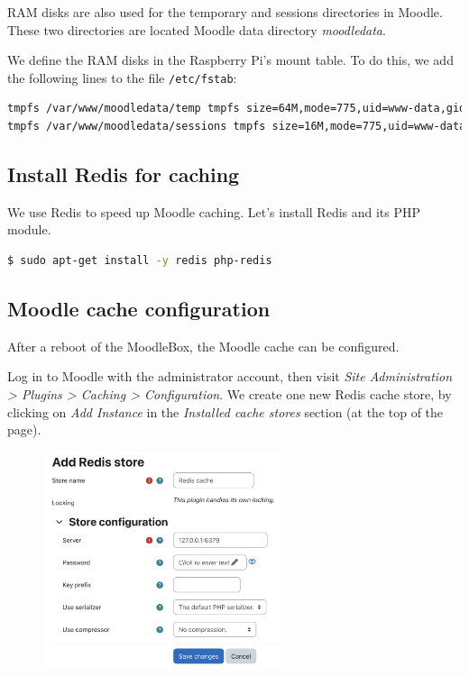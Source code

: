 \documentclass[12pt]{article}
\begin{document}
RAM disks are also used for the temporary and sessions directories in Moodle.
These two directories are located Moodle data directory \emph{moodledata}.

We define the RAM disks in the Raspberry Pi's mount table.
To do this, we add the following lines to the file \lstinline{/etc/fstab}:
\begin{lstlisting}[language=bash]
tmpfs /var/www/moodledata/temp tmpfs size=64M,mode=775,uid=www-data,gid=www-data 0 0
tmpfs /var/www/moodledata/sessions tmpfs size=16M,mode=775,uid=www-data,gid=www-data 0 0
\end{lstlisting}

%
%

\subsection{Install Redis for caching}

We use Redis to speed up Moodle caching.
Let's install Redis and its PHP module.

\begin{lstlisting}[language=bash]
$ sudo apt-get install -y redis php-redis
\end{lstlisting}

\subsection{Moodle cache configuration}\label{ssec-cache}

After a reboot of the MoodleBox, the Moodle cache can be configured.

Log in to Moodle with the administrator account, then visit \textsl{Site Administration > Plugins > Caching > Configuration}.
We create one new Redis cache store, by clicking on \emph{Add Instance} in the \emph{Installed cache stores} section (at the top of the page).

\begin{figure}[!ht]
\centering
\includegraphics[width=7cm]{cache-redis.png}
\end{figure}
\end{document}
